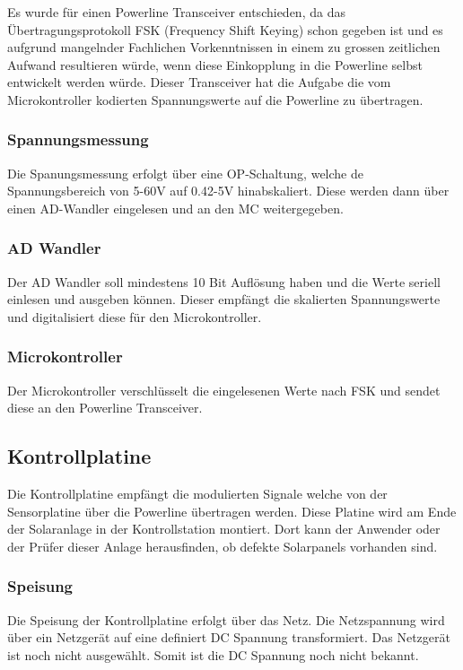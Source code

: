 Es wurde für einen Powerline Transceiver entschieden, da das Übertragungsprotokoll FSK (Frequency Shift Keying) schon gegeben ist und es aufgrund mangelnder Fachlichen Vorkenntnissen in einem zu grossen zeitlichen Aufwand resultieren würde, wenn diese Einkopplung in die Powerline selbst entwickelt werden würde. 
Dieser Transceiver hat die Aufgabe die vom Microkontroller kodierten Spannungswerte auf die Powerline zu übertragen.

\subsubsection{Spannungsmessung}

Die Spanungsmessung erfolgt über eine OP-Schaltung, welche de Spannungsbereich von 5-60V auf 0.42-5V hinabskaliert. Diese werden dann über einen AD-Wandler eingelesen und an den MC weitergegeben.

\subsubsection{AD Wandler}

Der AD Wandler soll mindestens 10 Bit Auflösung haben und die Werte seriell einlesen und ausgeben können. Dieser empfängt die skalierten Spannungswerte und digitalisiert diese für den Microkontroller.

\subsubsection{Microkontroller}

Der Microkontroller verschlüsselt die eingelesenen Werte nach FSK und sendet diese an den Powerline Transceiver.
\subsection{Kontrollplatine}

Die Kontrollplatine empfängt die modulierten Signale welche von der Sensorplatine über die Powerline übertragen werden. Diese Platine wird am Ende der Solaranlage in der Kontrollstation montiert. Dort kann der Anwender oder der Prüfer dieser Anlage herausfinden, ob defekte Solarpanels vorhanden sind.

\subsubsection{Speisung}
Die Speisung der Kontrollplatine erfolgt über das Netz. Die Netzspannung wird über ein Netzgerät auf eine definiert DC Spannung transformiert. Das Netzgerät ist noch nicht ausgewählt. Somit ist die DC Spannung noch nicht bekannt.


